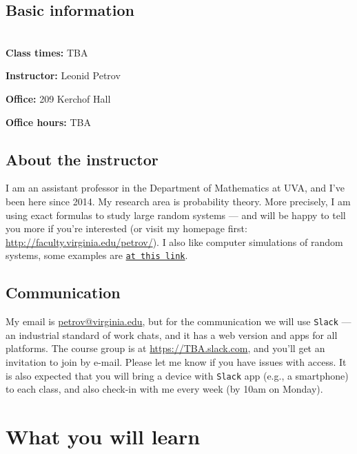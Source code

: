 \documentclass[oneside,11pt]{amsart}
\begin{document}
\subsection{Basic information}{\ }\\

\textbf{Class times:} TBA

\textbf{Instructor:} Leonid Petrov

\textbf{Office:} 209 Kerchof Hall

\textbf{Office hours:} TBA

\subsection{About the instructor}
I am an assistant professor in the Department of Mathematics at UVA,
and I've been here since 2014.
My research area is probability theory. 
More precisely, I am using exact formulas to study large random systems --- and will be 
happy to tell you more if you're interested (or visit my homepage first:
\url{http://faculty.virginia.edu/petrov/}).
I also like 
computer simulations of random systems, some examples are 
\href{http://faculty.virginia.edu/petrov//blog/2015/02/20/Shapes%20with%20holes/}{\texttt{at this link}}.

\subsection{Communication} My email is \href{mailto:petrov@virginia.edu}{petrov@virginia.edu}, 
but for the communication we will use \texttt{Slack} --- an industrial standard of work chats,
and it has a web version and apps for all platforms.
The course group is at \url{https://TBA.slack.com}, 
and you'll get an invitation to join by e-mail. 
Please let me know if you have issues with access.
It is also expected that you will bring a device with \texttt{Slack} app
(e.g., a smartphone)
to each class, 
and also check-in with me every week (by 10am on Monday).

\section{What you will learn}
\end{document}
